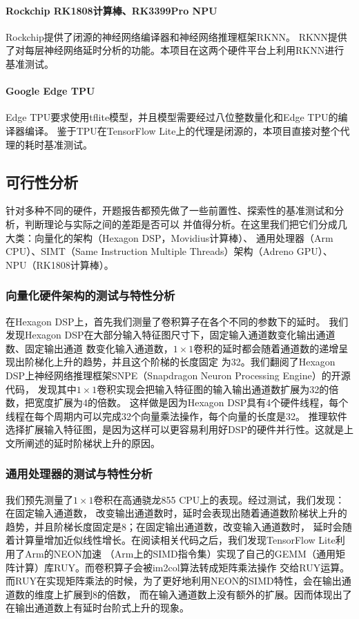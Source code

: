 \paragraph{Rockchip RK1808计算棒、RK3399Pro NPU}
Rockchip提供了闭源的神经网络编译器和神经网络推理框架RKNN。
RKNN提供了对每层神经网络延时分析的功能。本项目在这两个硬件平台上利用RKNN进行基准测试。

\paragraph{Google Edge TPU}
Edge TPU要求使用tflite模型，并且模型需要经过八位整数量化和Edge TPU的编译器编译。
鉴于TPU在TensorFlow Lite上的代理是闭源的，本项目直接对整个代理的耗时基准测试。

\subsection{可行性分析}
针对多种不同的硬件，开题报告都预先做了一些前置性、探索性的基准测试和分析，判断理论与实际之间的差距是否可以
并值得分析。在这里我们把它们分成几大类：向量化的架构（Hexagon DSP，Movidius计算棒）、
通用处理器（Arm CPU）、SIMT（Same Instruction Multiple Threads）架构（Adreno GPU）、NPU（RK1808计算棒）。

\subsubsection{向量化硬件架构的测试与特性分析}
在Hexagon DSP上，首先我们测量了卷积算子在各个不同的参数下的延时。
我们发现Hexagon DSP在大部分输入特征图尺寸下，固定输入通道数变化输出通道数、固定输出通道
数变化输入通道数，$1\times 1$卷积的延时都会随着通道数的递增呈现出阶梯化上升的趋势，并且这个阶梯的长度固定
为32。我们翻阅了Hexagon DSP上神经网络推理框架SNPE（Snapdragon Neuron Processing Engine）的开源代码，
发现其中$1\times 1$卷积实现会把输入特征图的输入输出通道数扩展为32的倍数，把宽度扩展为4的倍数。
这样做是因为Hexagon DSP具有4个硬件线程，每个线程在每个周期内可以完成32个向量乘法操作，每个向量的长度是32。
推理软件选择扩展输入特征图，是因为这样可以更容易利用好DSP的硬件并行性。这就是上文所阐述的延时阶梯状上升的原因。

\subsubsection{通用处理器的测试与特性分析}
我们预先测量了$1\times 1$卷积在高通骁龙855 CPU上的表现。经过测试，我们发现：在固定输入通道数，
改变输出通道数时，延时会表现出随着通道数阶梯状上升的趋势，并且阶梯长度固定是8；在固定输出通道数，改变输入通道数时，
延时会随着计算量增加近似线性增长。在阅读相关代码之后，我们发现TensorFlow Lite利用了Arm的NEON加速
（Arm上的SIMD指令集）实现了自己的GEMM（通用矩阵计算）库RUY。而卷积算子会被im2col算法转成矩阵乘法操作
交给RUY运算。而RUY在实现矩阵乘法的时候，为了更好地利用NEON的SIMD特性，会在输出通道数的维度上扩展到8的倍数，
而在输入通道数上没有额外的扩展。因而体现出了在输出通道数上有延时台阶式上升的现象。

